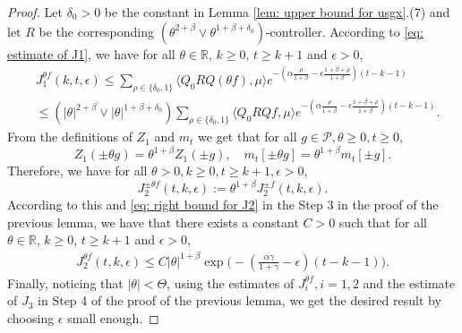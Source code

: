 \documentclass[12pt,a4paper]{amsart}
\theoremstyle{plain}
\theoremstyle{definition}
\numberwithin{equation}{section}
\begin{document}
\begin{proof}
    Let $\delta_0 >0$ be the constant in Lemma \ref{lem: upper bound for usgx}.(7) and let $R$ be the corresponding $(\theta^{2+\beta}\vee \theta^{1+\beta+\delta_0})$-controller.
	According to \eqref{eq: estimate of J1}, we have for all $\theta\in \mathbb R$, $k\geq 0$, $t\geq k+1$ and $\epsilon> 0$,
\begin{equation}\begin{split}
	&J^{\theta f}_1(k,t,\epsilon)
     \leq \sum_{\rho \in \{\delta_0,1\}} \langle Q_0 RQ(\theta f), \mu \rangle e^{-(\alpha\frac{\rho}{1+\beta}-\epsilon\frac{1+\beta+\rho}{1+\beta})(t-k-1)}
     \\& \leq(|\theta|^{2+\beta}\vee |\theta|^{1+\beta+\delta_0}) \sum_{\rho \in \{\delta_0,1\}} \langle Q_0 RQf, \mu \rangle e^{-(\alpha\frac{\rho}{1+\beta}-\epsilon\frac{1+\beta+\rho}{1+\beta})(t-k-1)}.
\end{split}\end{equation}
	From the definitions of $Z_1$ and $m_t$ we get that for all $g\in \mathcal P, \theta \geq 0, t\geq 0$,
\[
	Z_1( \pm \theta g) = \theta^{1+\beta} Z_1(\pm g), \quad m_t[\pm \theta g] = \theta^{1+\beta} m_t[\pm g].
\]
	Therefore, we have for all $\theta >0, k \geq 0, t\geq k+1, \epsilon > 0$,
\[
J^{\pm \theta f}_2(t,k,\epsilon)
	:= \theta^{1+\beta} J_2^{\pm f}(t,k,\epsilon).
\]
	According to this and \eqref{eq: right bound for J2} in the Step 3 in the proof of the previous lemma, we have that there exists a constant $C > 0$ such that for all $\theta\in \mathbb R$, $k\geq 0$, $t\geq k+1$ and $\epsilon> 0$,
\begin{equation}\begin{split}
\label{eq:31step3b}
    J^{\theta f}_2(t,k,\epsilon)
    \leq C |\theta|^{1+\beta}\exp\Big(-(\frac{\alpha\gamma}{1+\gamma}-\epsilon)(t-k-1)\Big).
\end{split}\end{equation}
	Finally, noticing that $|\theta| < \Theta$, using the estimates of $J^{\theta f}_{i}, i = 1,2$ and the estimate of $J_3$ in Step 4 of the proof of the previous lemma, we get the desired result by choosing $\epsilon$ small enough.
\end{proof}
\end{document}
